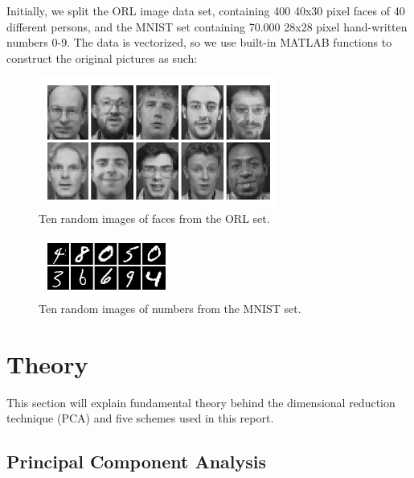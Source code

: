 \documentclass[journal]{IEEEtran}
\begin{document}
Initially, we split the ORL image data set, containing 400 40x30 pixel faces of 40 different persons, and the MNIST set containing 70.000 28x28 pixel hand-written numbers 0-9. The data is vectorized, so we use built-in MATLAB functions to construct the original pictures as such:

\begin{figure}[h]
	\centering
	\includegraphics[width=0.7\linewidth]{orlfaces}
	\caption{Ten random images of faces from the ORL set.}
	\label{fig:orlfaces}
\end{figure}

\begin{figure}[h]
	\centering
	\includegraphics[width=0.7\linewidth]{mnistnumbers}
	\caption{Ten random images of numbers from the MNIST set.}
	\label{fig:mnistnumbers}
\end{figure}


\section{Theory}
This section will explain fundamental theory behind the dimensional reduction technique (PCA) and five schemes used in this report.

\subsection{Principal Component Analysis}
\end{document}
